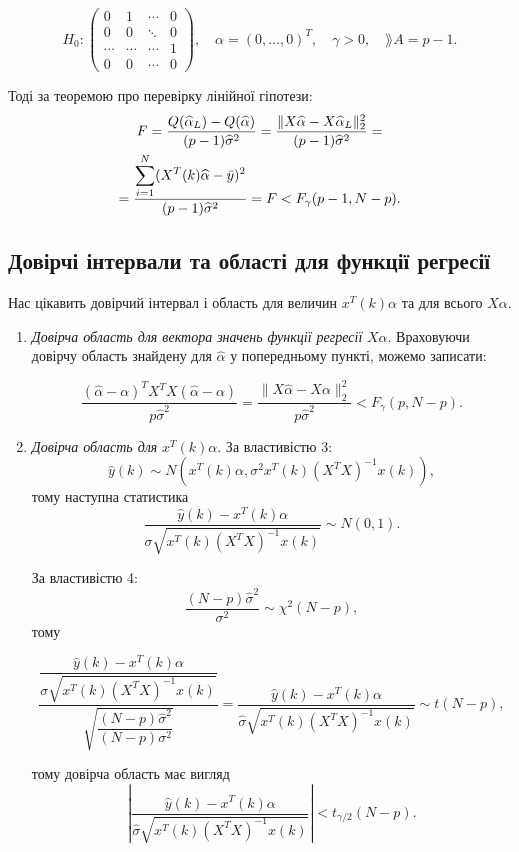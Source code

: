 \begin{enumerate}
	\[H_0: \begin{pmatrix} 0 & 1 & \cdots & 0 \\ 0 & 0 & \ddots & 0 \\ \cdots & \cdots & \cdots & 1 \\ 0 & 0 & \cdots & 0\end{pmatrix}, \quad \alpha = (0, \ldots, 0)^T,\quad  \gamma > 0, \quad \rang  A = p - 1. \]

	Тоді за теоремою про перевірку лінійної гіпотези:
	\begin{multline*}
		F = \dfrac{Q(\widehat{\alpha}_L)-Q(\widehat{\alpha})}{(p-1)\widehat{\sigma}^2} = \dfrac{\|X\widehat{\alpha}-X\widehat{\alpha}_L\|_2^2}{(p-1)\widehat{\sigma}^2} = \\
		= \dfrac{\displaystyle\sum\limits_{i=1}^N (X^T(k)\widehat{\alpha}-\bar{y})^2}{(p-1)\widehat{\sigma}^2} = F < F_\gamma(p-1,N-p).
	\end{multline*}
\end{enumerate}

\subsection{Довірчі інтервали та області для функції регресії}

Нас цікавить довірчий інтервал і область для величин $x^T(k)\alpha$ та для всього $X\alpha$.

\begin{enumerate}
	\item \textit{Довірча область для вектора значень функції регресії} $X\alpha$. Враховуючи довірчу область знайдену для $\widehat{\alpha}$ у попередньому пункті, можемо записати:

	\[\dfrac{(\widehat{\alpha}-\alpha)^TX^TX(\widehat{\alpha}-\alpha)}{p\widehat{\sigma}^2} = \dfrac{\|X\widehat{\alpha}-X\alpha\|_2^2}{p\widehat{\sigma}^2} < F_\gamma(p,N-p). \]

	\item \textit{Довірча область для} $x^T(k)\alpha$. За властивістю 3: \[ \widehat{y}(k) \sim N(x^T(k)\alpha,\sigma^2x^T(k)(X^TX)^{-1}x(k)), \] тому наступна статистика \[ \dfrac{\widehat{y}(k)-x^T(k)\alpha}{\sigma\sqrt{x^T(k)(X^TX)^{-1}x(k)}} \sim N(0,1). \]

	За властивістю 4: \[ \dfrac{(N-p)\widehat{\sigma}^2}{\sigma^2}\sim\chi^2(N-p), \] тому

	\[ \dfrac{\dfrac{\widehat{y}(k)-x^T(k)\alpha}{\sigma\sqrt{x^T(k)(X^TX)^{-1}x(k)}}}{\sqrt{\dfrac{(N-p)\widehat{\sigma}^2}{(N-p)\sigma^2}}} = \dfrac{\widehat{y}(k)-x^T(k)\alpha}{\widehat{\sigma}\sqrt{x^T(k)(X^TX)^{-1}x(k)}} \sim t(N-p), \] 

	тому довірча область має вигляд \[ \left|\dfrac{\widehat{y}(k)-x^T(k)\alpha}{\widehat{\sigma}\sqrt{x^T(k)(X^TX)^{-1}x(k)}}\right| < t_{\gamma/2}(N-p). \]
\end{enumerate}

